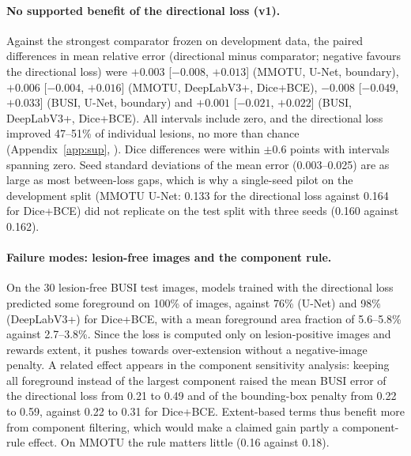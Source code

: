 \documentclass{midl}
\begin{document}
\paragraph{No supported benefit of the directional loss (v1).}
Against the strongest comparator frozen on development data, the paired differences in mean relative error (directional minus comparator; negative favours the directional loss) were $+0.003$ [$-0.008$, $+0.013$] (MMOTU, U-Net, boundary), $+0.006$ [$-0.004$, $+0.016$] (MMOTU, DeepLabV3+, Dice+BCE), $-0.008$ [$-0.049$, $+0.033$] (BUSI, U-Net, boundary) and $+0.001$ [$-0.021$, $+0.022$] (BUSI, DeepLabV3+, Dice+BCE). All intervals include zero, and the directional loss improved 47--51\% of individual lesions, no more than chance (Appendix~\ref{app:sup}, ). Dice differences were within $\pm0.6$ points with intervals spanning zero. Seed standard deviations of the mean error (0.003--0.025) are as large as most between-loss gaps, which is why a single-seed pilot on the development split (MMOTU U-Net: 0.133 for the directional loss against 0.164 for Dice+BCE) did not replicate on the test split with three seeds (0.160 against 0.162).

\paragraph{Failure modes: lesion-free images and the component rule.}
On the 30 lesion-free BUSI test images, models trained with the directional loss predicted some foreground on 100\% of images, against 76\% (U-Net) and 98\% (DeepLabV3+) for Dice+BCE, with a mean foreground area fraction of 5.6--5.8\% against 2.7--3.8\%. Since the loss is computed only on lesion-positive images and rewards extent, it pushes towards over-extension without a negative-image penalty. A related effect appears in the component sensitivity analysis: keeping all foreground instead of the largest component raised the mean BUSI error of the directional loss from 0.21 to 0.49 and of the bounding-box penalty from 0.22 to 0.59, against 0.22 to 0.31 for Dice+BCE. Extent-based terms thus benefit more from component filtering, which would make a claimed gain partly a component-rule effect. On MMOTU the rule matters little (0.16 against 0.18).
\end{document}
